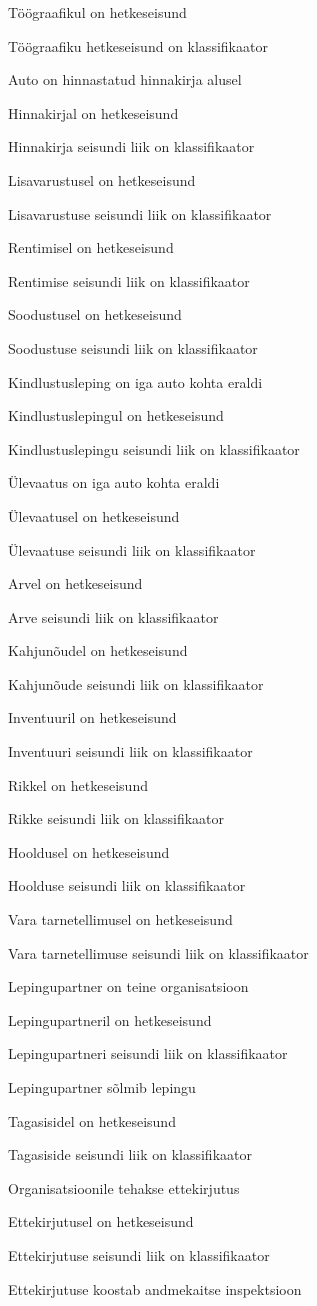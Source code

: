 \begin{myitemize}
	\item Töögraafikul on hetkeseisund
	\item Töögraafiku hetkeseisund on klassifikaator
	\item Auto on hinnastatud hinnakirja alusel
	\item Hinnakirjal on hetkeseisund
	\item Hinnakirja seisundi liik on klassifikaator
	\item Lisavarustusel on hetkeseisund
	\item Lisavarustuse seisundi liik on klassifikaator
	\item Rentimisel on hetkeseisund
	\item Rentimise seisundi liik on klassifikaator
	\item Soodustusel on hetkeseisund
	\item Soodustuse seisundi liik on klassifikaator
	\item Kindlustusleping on iga auto kohta eraldi
	\item Kindlustuslepingul on hetkeseisund
	\item Kindlustuslepingu seisundi liik on klassifikaator
	\item Ülevaatus on iga auto kohta eraldi
	\item Ülevaatusel on hetkeseisund
	\item Ülevaatuse seisundi liik on klassifikaator
	\item Arvel on hetkeseisund
	\item Arve seisundi liik on klassifikaator
	\item Kahjunõudel on hetkeseisund
	\item Kahjunõude seisundi liik on klassifikaator
	\item Inventuuril on hetkeseisund
	\item Inventuuri seisundi liik on klassifikaator
	\item Rikkel on hetkeseisund
	\item Rikke seisundi liik on klassifikaator
	\item Hooldusel on hetkeseisund
	\item Hoolduse seisundi liik on klassifikaator
	\item Vara tarnetellimusel on hetkeseisund
	\item Vara tarnetellimuse seisundi liik on klassifikaator
	\item Lepingupartner on teine organisatsioon
	\item Lepingupartneril on hetkeseisund
	\item Lepingupartneri seisundi liik on klassifikaator
	\item Lepingupartner sõlmib lepingu
	\item Tagasisidel on hetkeseisund
	\item Tagasiside seisundi liik on klassifikaator
	\item Organisatsioonile tehakse ettekirjutus 
	\item Ettekirjutusel on hetkeseisund
	\item Ettekirjutuse seisundi liik on klassifikaator
	\item Ettekirjutuse koostab andmekaitse inspektsioon
\end{myitemize}

